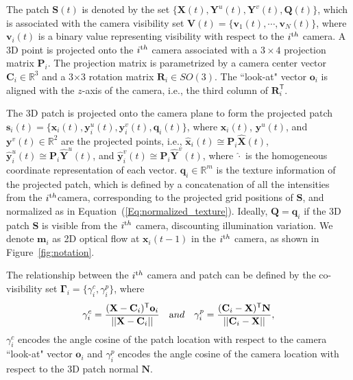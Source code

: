 The patch $\mathbf{S}(t)$ is denoted by the set $\{\mathbf{X}(t), \mathbf{Y}^u(t), \mathbf{Y}^v(t),\mathbf{Q}(t)\}$, which is associated with the camera visibility set $\mathbf{V}(t) = \{\mathbf{v}_1(t),\cdots,\mathbf{v}_N(t)\}$, where $\mathbf{v}_i(t)$ is a binary value representing visibility with respect to  the $i^{\textrm th}$ camera. %
A 3D point is projected onto the $i^{\textrm th}$ camera associated with a $3\times4$ projection matrix $\mathbf{P}_i$. The projection matrix is parametrized by a camera center vector $\mathbf{C}_i \in \mathds{R}^3$ and a 3$\times$3 rotation matrix $\mathbf{R}_i \in SO(3)$. The ``look-at" vector $\mathbf{o}_i$ is aligned with the $z$-axis of the camera, i.e., the third column of $\mathbf{R}_i^\mathsf{T}$. 

The 3D patch is projected onto the camera plane to form the projected patch $\mathbf{s}_i(t) = \{\mathbf{x}_i(t), \mathbf{y}_i^u(t), \mathbf{y}_i^v(t), \mathbf{q}_i(t) \}$, where $\mathbf{x}_i(t)$, $\mathbf{y}^u(t)$, and $\mathbf{y}^v(t) \in \mathds{R}^2$ are the projected points, i.e., $\widehat{\mathbf{x}}_i(t) \cong \mathbf{P}_i \widehat{\mathbf{X}}(t)$, $\widehat{\mathbf{y}}_i^u(t) \cong \mathbf{P}_i \widehat{\mathbf{Y}}^u(t)$, and $\widehat{\mathbf{y}}_i^v(t) \cong \mathbf{P}_i \widehat{\mathbf{Y}}^v(t)$, where $\widehat{\cdot}$ is the homogeneous coordinate representation of each vector. $\mathbf{q}_i  \in \mathds{R}^m$ is the texture information of the projected patch, which is defined by a concatenation of all the intensities from the $i^{\textrm th}$camera, corresponding to the projected grid positions of $\mathbf{S}$, and normalized as in Equation~(\ref{Eq:normalized_texture}). Ideally, $\mathbf{Q}=\mathbf{q}_i$ if the 3D patch $\mathbf{S}$ is visible from the $i^{\textrm th}$ camera, discounting illumination variation. We denote $\mathbf{m}_i$ as 2D optical flow at $\mathbf{x}_i(t-1)$ in the $i^{\textrm th}$ camera, as shown in Figure~\ref{fig:notation}. 

The relationship between the $i^{\textrm th}$ camera and patch can be defined by the co-visibility set $\bm{\Gamma}_i = \{\gamma^c_i, \gamma^p_i\}$, where
\begin{eqnarray}
\gamma^c_i = \frac{ (\mathbf{X}-\mathbf{C}_i)^\mathsf{T}\mathbf{o}_i} { || \mathbf{X}-\mathbf{C}_i || }~~~{\textrm and}~~~\gamma^p_i = \frac{ (\mathbf{C}_i - \mathbf{X})^\mathsf{T}\mathbf{N}} { || \mathbf{C}_i - \mathbf{X} || }, \nonumber
\end{eqnarray}
$\gamma^c_i$ encodes the angle cosine of the patch location with respect to the camera ``look-at" vector $\mathbf{o}_i$ and $\gamma^p_i$ encodes the angle cosine of the camera location with respect to the 3D patch normal $\mathbf{N}$.

